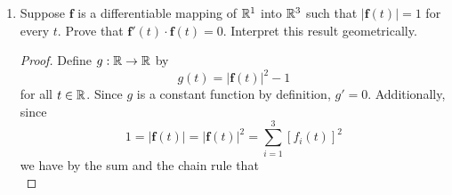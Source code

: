 \documentclass[../psets.tex]{subfiles}
\begin{document}
\begin{enumerate}[label={\textbf{\arabic*.}}]
\begin{proof}
        Suppose for the sake of contradiction that $\mathbf{f}$ is not constant on $E$. Then there exist $\vec{a},\vec{b}\in E$ such that $\mathbf{f}(\vec{a})\neq\mathbf{f}(\vec{b})$. Let
        \begin{align*}
            A &= \mathbf{f}^{-1}(\{\mathbf{f}(\vec{a})\})&
            B &= E\setminus A
        \end{align*}
        Since $\vec{a}\in A$ and $\vec{b}\in B$, $A,B$ are nonempty. Additionally, we clearly have that $E=A\cup B$ and $A\cup B=\emptyset$. Furthermore, since $A$ is closed by Theorem 4.8, Theorem 2.27b implies that $\bar{A}=A$ and hence
        \begin{equation*}
            \bar{A}\cap B = A\cap B = \emptyset
        \end{equation*}
        These results combined with the fact that $E$ is connected by hypothesis implies that $A\cap\bar{B}\neq\emptyset$. Let $\vec{x}\in A\cap\bar{B}$. It follows by the definition of the closure of $B$ and since $A\cap B=\emptyset$ that $\vec{x}\in A\cap LP(B)$, where $LP(B)$ denotes the set of all limit points of $B$. Now since $E$ is open, there exists $N_r(\vec{x})\subset E$. Thus, since $\vec{x}\in LP(B)$, there exists $\vec{c}\in N_r(\vec{x})$ such that $\vec{c}\in B$. With $\vec{x}\in A$ and $\vec{c}\in B$, we have that $\mathbf{f}(\vec{c})\neq\mathbf{f}(\vec{a})$. But $N_r(\vec{x})$ is convex, so since $\mathbf{f}'(\vec{x})=0$ for all points in $N_r(\vec{x})\subset E$, we have by the Corollary to Theorem 9.19 that $\mathbf{f}$ is constant on $N_r(\vec{x})$, a contradiction.
    \end{proof}
    \setcounter{enumi}{12}
    \item Suppose $\mathbf{f}$ is a differentiable mapping of $\mathbb{R}^1$ into $\mathbb{R}^3$ such that $|\mathbf{f}(t)|=1$ for every $t$. Prove that $\mathbf{f}'(t)\cdot\mathbf{f}(t)=0$. Interpret this result geometrically.
    \begin{proof}
        Define $g:\mathbb{R}\to\mathbb{R}$ by
        \begin{equation*}
            g(t) = |\mathbf{f}(t)|^2-1
        \end{equation*}
        for all $t\in\mathbb{R}$. Since $g$ is a constant function by definition, $g'=0$. Additionally, since
        \begin{equation*}
            1 = |\mathbf{f}(t)| = |\mathbf{f}(t)|^2 = \sum_{i=1}^3[f_i(t)]^2
        \end{equation*}
        we have by the sum and the chain rule that
        \begin{equation*}

\end{equation*}
\end{proof}
\end{enumerate}
\end{document}
